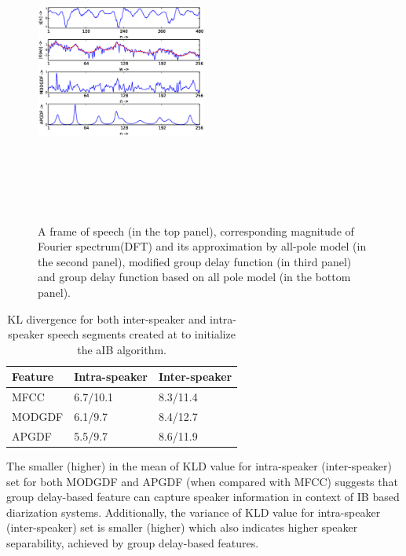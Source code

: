 \documentclass[conference]{IEEEtran}
\begin{document}
\begin{figure}[h]
\centering
\includegraphics[width=0.5\textwidth,height=10cm]{figures/apSpectrum.eps}
\caption{ A frame of speech (in the top panel), corresponding magnitude of
Fourier spectrum(DFT) and its approximation by all-pole model (in the second
panel), modified group delay function (in third panel) and group delay function 
based on all pole model (in the bottom panel).}
\label{fig:all-pole}
\end{figure}


\begin{table}[h]
\centering

\begin{tabular}{|l|l|l|}
\hline
Feature 			& Intra-speaker 			& Inter-speaker 	 \\ \hline
MFCC          			& 6.7/10.1               & 8.3/11.4       \\ \hline
MODGDF        			& 6.1/9.7                & 8.4/12.7       \\ \hline
APGDF         			& 5.5/9.7                & 8.6/11.9        \\ \hline
\end{tabular}

\vspace{0.4cm}
\caption{KL divergence for both inter-speaker and intra-speaker speech segments
created at to initialize the aIB algorithm.}

\label{table:kl-div}
\end{table}

The smaller (higher) in the mean of KLD value for intra-speaker
(inter-speaker) set for both MODGDF and APGDF (when compared with MFCC) suggests that group delay-based
feature can capture speaker information in context of IB based diarization
systems. Additionally, the variance of KLD value for intra-speaker
(inter-speaker) set is smaller (higher) which also indicates higher speaker
separability, achieved by group delay-based features. 
\end{document}
